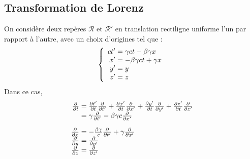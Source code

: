 \subsection{Transformation de Lorenz}
On considère deux repères $\mathcal{R}$ et $\mathcal{R}'$ en translation rectiligne uniforme l'un par rapport à l'autre, avec un choix d'origines tel que :
{\renewcommand*{\arraystretch}{1.2}
$$
	\left\{ \begin{array}{r@{\;}l}
		ct'&=\gamma ct-\beta\gamma x\\
		x'&=-\beta\gamma ct+\gamma x\\
		y'&=y\\
		z'&=z
	\end{array} \right.
$$}
Dans ce cas,
$$
	\begin{array}{r@{\;}l}
		\frac{\partial}{\partial t}&=\frac{\partial t'}{\partial t} \frac{\partial}{\partial t'}
				+\frac{\partial x'}{\partial t} \frac{\partial}{\partial x'}
				+\frac{\partial y'}{\partial t} \frac{\partial}{\partial y'}
				+\frac{\partial z'}{\partial t} \frac{\partial}{\partial z'}\\
			&=\gamma\frac{\partial}{\partial t'}-\beta\gamma c\frac{\partial}{\partial x'}\\[10pt]
		\frac{\partial}{\partial x}&=-\frac{\beta\gamma}{c}\frac{\partial}{\partial t'}+\gamma\frac{\partial}{\partial x'}\\
		\frac{\partial}{\partial y}&=\frac{\partial}{\partial y'}\\
		\frac{\partial}{\partial z}&=\frac{\partial}{\partial z'}
	\end{array}
$$

